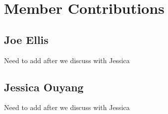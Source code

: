 \documentclass[paper=a4, fontsize=11pt]{scrartcl} %
\begin{document}
\section{Member Contributions}

\subsection{Joe Ellis}
{\color{red} Need to add after we discuss with Jessica}

\subsection{Jessica Ouyang}
{\color{red} Need to add after we discuss with Jessica}






\end{document}
